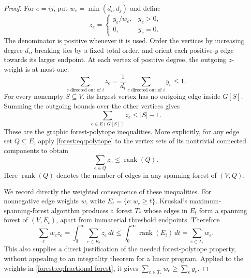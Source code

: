 \documentclass[letterpaper,11pt]{article}
\theoremstyle{definition}
\DeclareMathOperator{\rank}{rank}
\begin{document}
\begin{proof}
For $e=ij$, put $w_e=\min(d_i,d_j)$ and define
\begin{equation}
 z_e=
 \begin{cases}
 y_e/w_e,&y_e>0,\\
 0,&y_e=0.
 \end{cases}
 \label{forest:eq:fractional-forest}
\end{equation}
The denominator is positive whenever it is used.  Order the vertices
by increasing degree $d_i$, breaking ties by a fixed total order, and
orient each positive-$y$ edge towards its larger endpoint.  At each
vertex of positive degree, the outgoing $z$-weight is at most one:
\[
 \sum_{e\text{ directed out of }i}z_e
 =\frac{1}{d_i}\sum_{e\text{ directed out of }i}y_e\leq 1.
\]
For every nonempty $S\subseteq V$, its largest vertex has no outgoing
edge inside $G[S]$.  Summing the outgoing bounds over the other
vertices gives
\begin{equation}
 \sum_{e\in E(G[S])}z_e\leq |S|-1.
 \label{forest:eq:polytope}
\end{equation}
These are the graphic forest-polytope inequalities.  More explicitly,
for any edge set $Q\subseteq E$, apply
\eqref{forest:eq:polytope} to the vertex sets of its nontrivial
connected components to obtain
\begin{equation}
 \sum_{e\in Q}z_e\leq\rank(Q).
 \label{forest:eq:rank-inequality}
\end{equation}
Here $\rank(Q)$ denotes the number of edges in any spanning forest of
$(V,Q)$.

We record directly the weighted consequence of these inequalities.
For nonnegative edge weights $w$, write
$E_t=\{e:w_e\geq t\}$.  Kruskal's maximum-spanning-forest algorithm
produces a forest $T_*$ whose edges in $E_t$ form a spanning forest of
$(V,E_t)$, apart from immaterial threshold endpoints.  Therefore
\begin{equation}
 \sum_e w_ez_e
 =\int_0^\infty\sum_{e\in E_t}z_e\,dt
 \leq\int_0^\infty\rank(E_t)\,dt
 =\sum_{e\in T_*}w_e.
 \label{forest:eq:weighted-domination}
\end{equation}
This also supplies a direct justification of the needed forest-polytope
property, without appealing to an integrality theorem for a linear
program.  Applied to the weights in
\eqref{forest:eq:fractional-forest}, it gives
$\sum_{e\in T_*}w_e\geq\sum_ey_e$.


\end{proof}
\end{document}
